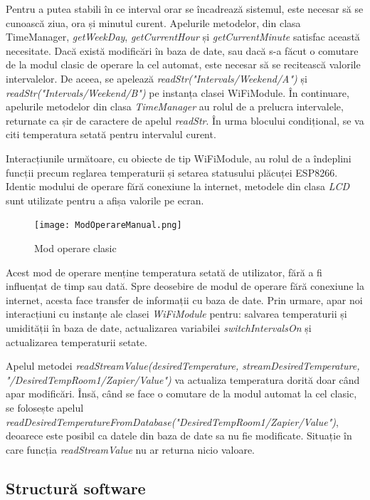 	Pentru a putea stabili în ce interval orar se încadrează sistemul, este necesar să se cunoască ziua, ora și minutul curent. Apelurile metodelor, din clasa TimeManager, \textit{getWeekDay}, \textit{getCurrentHour} și \textit{getCurrentMinute} satisfac această necesitate. Dacă există modificări în baza de date, sau dacă s-a făcut o comutare de la modul clasic de operare la cel automat, este necesar să se recitească valorile intervalelor. De aceea, se apelează \textit{readStr("Intervals/Weekend/A")} și \textit{readStr("Intervals/Weekend/B")} pe instanța clasei WiFiModule. În continuare, apelurile metodelor din clasa \textit{TimeManager} au rolul de a prelucra intervalele, returnate ca șir de caractere de apelul \textit{readStr}. În urma blocului condițional, se va citi temperatura setată pentru intervalul curent.

	Interacțiunile următoare, cu obiecte de tip WiFiModule, au rolul de a îndeplini funcții precum reglarea temperaturii și setarea statusului plăcuței ESP8266. Identic modului de operare fără conexiune la internet, metodele din clasa \textit{LCD} sunt utilizate pentru a afișa valorile pe ecran. 

\begin{figure}[H]
   	\centering
    	\texttt{[image: ModOperareManual.png]}
	\caption{Mod operare clasic}
\end{figure}

	Acest mod de operare menține temperatura setată de utilizator, fără a fi influențat de timp sau dată. Spre deosebire de modul de operare fără conexiune la internet, acesta face transfer de informații cu baza de date. Prin urmare, apar noi interacțiuni cu instanțe ale clasei \textit{WiFiModule} pentru: salvarea temperaturii și umidității în baza de date, actualizarea variabilei \textit{switchIntervalsOn} și actualizarea temperaturii setate.

	Apelul metodei \textit{readStreamValue(desiredTemperature, streamDesiredTemperature, "/DesiredTempRoom1/Zapier/Value")} va actualiza temperatura dorită doar când apar modificări. Însă, când se face o comutare de la modul automat la cel clasic, se folosește apelul \textit{readDesiredTemperatureFromDatabase("DesiredTempRoom1/Zapier/Value")}, deoarece este posibil ca datele din baza de date sa nu fie modificate. Situație în care funcția \textit{readStreamValue} nu ar returna nicio valoare.

\subsection{Structură software}

